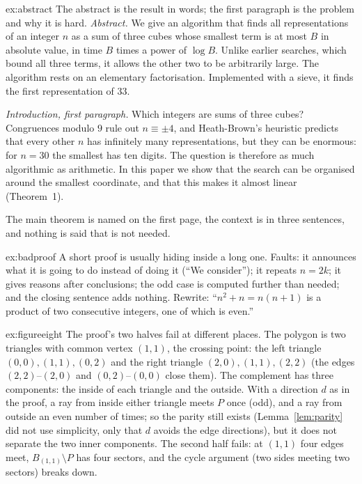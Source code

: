 \begin{solution}{ex:abstract}
\idea The abstract is the result in words; the first paragraph is the problem and why it is hard.
\writeup \emph{Abstract.} We give an algorithm that finds all representations of an integer $n$ as a sum of three cubes whose smallest term is at most $B$ in absolute value, in time $B$ times a power of $\log B$. Unlike earlier searches, which bound all three terms, it allows the other two to be arbitrarily large. The algorithm rests on an elementary factorisation. Implemented with a sieve, it finds the first representation of $33$.

\emph{Introduction, first paragraph.} Which integers are sums of three cubes? Congruences modulo $9$ rule out $n\equiv\pm4$, and Heath-Brown's heuristic predicts that every other $n$ has infinitely many representations, but they can be enormous: for $n=30$ the smallest has ten digits. The question is therefore as much algorithmic as arithmetic. In this paper we show that the search can be organised around the smallest coordinate, and that this makes it almost linear (Theorem~1).

The main theorem is named on the first page, the context is in three sentences, and nothing is said that is not needed.
\end{solution}

\begin{solution}{ex:badproof}
\idea A short proof is usually hiding inside a long one.
\writeup Faults: it announces what it is going to do instead of doing it (``We consider''); it repeats $n=2k$; it gives reasons after conclusions; the odd case is computed further than needed; and the closing sentence adds nothing. Rewrite: ``$n^2+n=n(n+1)$ is a product of two consecutive integers, one of which is even.''
\end{solution}

\begin{solution}{ex:figureeight}
\idea The proof's two halves fail at different places.
\writeup The polygon is two triangles with common vertex $(1,1)$, the crossing point: the left triangle $(0,0),(1,1),(0,2)$ and the right triangle $(2,0),(1,1),(2,2)$ (the edges $(2,2)$--$(2,0)$ and $(0,2)$--$(0,0)$ close them). The complement has three components: the inside of each triangle and the outside. With a direction $d$ as in the proof, a ray from inside either triangle meets $P$ once (odd), and a ray from outside an even number of times; so the parity still exists (Lemma~\ref{lem:parity} did not use simplicity, only that $d$ avoids the edge directions), but it does not separate the two inner components. The second half fails: at $(1,1)$ four edges meet, $B_{(1,1)}\setminus P$ has four sectors, and the cycle argument (two sides meeting two sectors) breaks down.
\end{solution}

